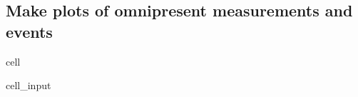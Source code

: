 \documentclass[letterpaper,10pt,english]{jupyterBook}
\begin{document}
\subsection{Make plots of omnipresent measurements and events}
\label{\detokenize{2_Data_sources/APIs/OpenWeather:make-plots-of-omnipresent-measurements-and-events}}
\begin{sphinxuseclass}{cell}\begin{sphinxVerbatimInput}

\begin{sphinxuseclass}{cell_input}
\begin{sphinxVerbatim}[commandchars=\\\{\}]
  \PYG{p}{[}\PYG{p}{]}
  \PYG{p}{[}\PYG{p}{]}
   \PYG{p}{[}\PYG{p}{]}
    \PYG{p}{[}\PYG{p}{]}\PYG{p}{[}\PYG{p}{]}
    \PYG{p}{[}\PYG{p}{]}
\end{sphinxVerbatim}

\end{sphinxuseclass}\end{sphinxVerbatimInput}

\end{sphinxuseclass}
\end{document}
